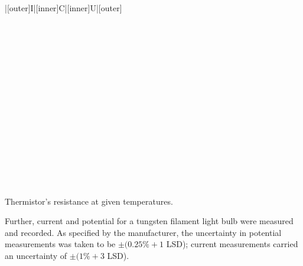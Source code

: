 \begin{paper}
{\begin{papertable}{|[outer]I|[inner]C|[inner]U|[outer]}
			\papertableindex{}\\\paperiline
			\papertableindex{}\\\paperiline
			\papertableindex{}\\\paperiline
			\papertableindex{}\\\paperiline
			\papertableindex{}\\\paperiline
			\papertableindex{}\\\paperiline
			\papertableindex{}\\\paperiline
			\papertableindex{}\\\paperiline
			\papertableindex{}\\\paperiline
			\papertableindex{}\\\paperiline
			\papertableindex{}\\\paperiline
			\papertableindex{}\\\paperiline
			\papertableindex{}\\\paperiline
			\papertableindex{}\\\paperiline
			\papertableindex{}\\\paperiline
			\papertableindex{}\\\paperoline
		\end{papertable}\vspace{-1.5em}}
	{Thermistor's resistance at given temperatures. }\vspace{0.5em}
	
	Further, current and potential for a tungsten filament light bulb were measured and recorded. As specified by the manufacturer, the uncertainty in potential measurements was taken to be \( \pm (0.25\% + 1 \) LSD); current measurements carried an uncertainty of \( \pm (1\% + 3 \) LSD). \vspace{0.5em}


\end{paper}
